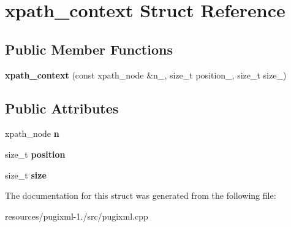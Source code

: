 \hypertarget{structxpath__context}{\section{xpath\+\_\+context Struct Reference}
\label{structxpath__context}
}
\subsection*{Public Member Functions}
\begin{DoxyCompactItemize}
\item 
\hypertarget{structxpath__context_ab5d7a8d5a14ef695b93e15cfb0e20386}{{\bfseries xpath\+\_\+context} (const xpath\+\_\+node \&n\+\_\+, size\+\_\+t position\+\_\+, size\+\_\+t size\+\_\+)}\label{structxpath__context_ab5d7a8d5a14ef695b93e15cfb0e20386}

\end{DoxyCompactItemize}
\subsection*{Public Attributes}
\begin{DoxyCompactItemize}
\item 
\hypertarget{structxpath__context_ace8fbb8121820bc5054605c166101273}{xpath\+\_\+node {\bfseries n}}\label{structxpath__context_ace8fbb8121820bc5054605c166101273}

\item 
\hypertarget{structxpath__context_add1fc9bd16b21d3a8d7a4bd63c60af07}{size\+\_\+t {\bfseries position}}\label{structxpath__context_add1fc9bd16b21d3a8d7a4bd63c60af07}

\item 
\hypertarget{structxpath__context_a976ffb0eff84a7779c97e589c1785d1c}{size\+\_\+t {\bfseries size}}\label{structxpath__context_a976ffb0eff84a7779c97e589c1785d1c}

\end{DoxyCompactItemize}


The documentation for this struct was generated from the following file\+:\begin{DoxyCompactItemize}
\item 
resources/pugixml-\/1./src/pugixml.\+cpp\end{DoxyCompactItemize}

